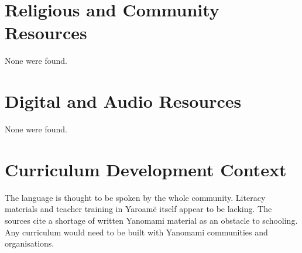 \documentclass[12pt]{article}
\begin{document}
\section{Religious and Community Resources}
None were found.

\section{Digital and Audio Resources}
None were found.

\section{Curriculum Development Context}
The language is thought to be spoken by the whole community. Literacy materials and teacher training in Yaroam\"e itself appear to be lacking. The sources cite a shortage of written Yanomami material as an obstacle to schooling. Any curriculum would need to be built with Yanomami communities and organisations.
\end{document}
